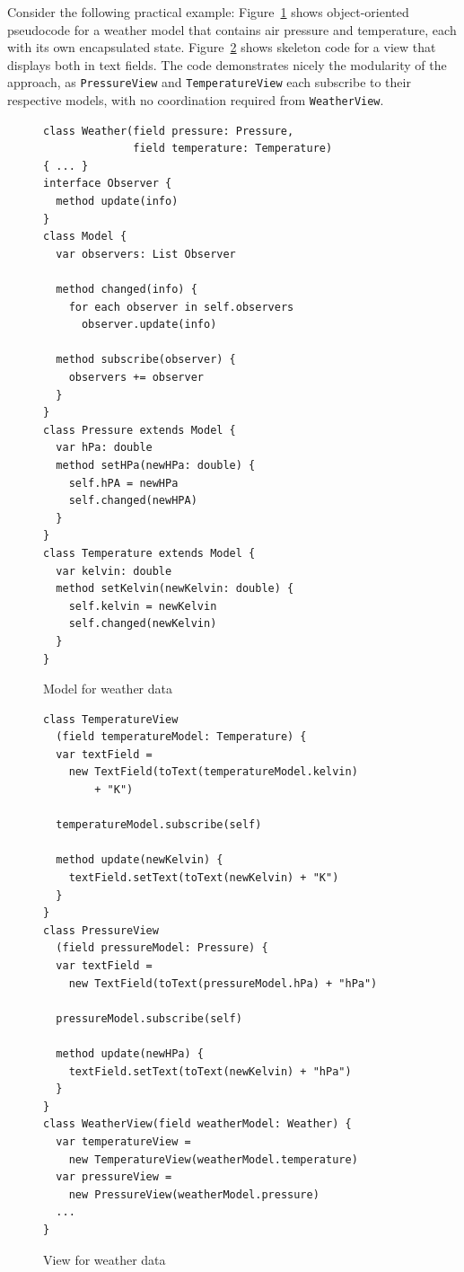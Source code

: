 \documentclass[sigplan,screen]{acmart}
\begin{document}
%
%
Consider the following practical example:
Figure~\ref{fig:weather-model} shows object-oriented pseudocode for a
weather model that contains air pressure and temperature, each with
its own encapsulated state.  Figure~\ref{fig:weather-view} shows
skeleton code for a view that displays both in text fields.  The code
demonstrates nicely the modularity of the approach, as
\texttt{PressureView} and \texttt{TemperatureView} each subscribe to
their respective models, with no coordination required from
\texttt{WeatherView}.

\begin{figure}[tb]
\begin{verbatim}
class Weather(field pressure: Pressure,
              field temperature: Temperature)
{ ... }
interface Observer {
  method update(info)
}
class Model {
  var observers: List Observer

  method changed(info) {
    for each observer in self.observers
      observer.update(info)

  method subscribe(observer) {
    observers += observer
  }
}
class Pressure extends Model {
  var hPa: double
  method setHPa(newHPa: double) {
    self.hPA = newHPa
    self.changed(newHPA)
  }
}
class Temperature extends Model {
  var kelvin: double
  method setKelvin(newKelvin: double) {
    self.kelvin = newKelvin
    self.changed(newKelvin)
  }
}
\end{verbatim}
  \vspace*{-3ex}
  \caption{Model for weather data}
  \label{fig:weather-model}
\end{figure}

\begin{figure}[tb]
\begin{verbatim}
class TemperatureView
  (field temperatureModel: Temperature) {
  var textField =
    new TextField(toText(temperatureModel.kelvin)
        + "K")

  temperatureModel.subscribe(self)

  method update(newKelvin) {
    textField.setText(toText(newKelvin) + "K")
  }
}
class PressureView
  (field pressureModel: Pressure) {
  var textField =
    new TextField(toText(pressureModel.hPa) + "hPa")

  pressureModel.subscribe(self)

  method update(newHPa) {
    textField.setText(toText(newKelvin) + "hPa")
  }
}
class WeatherView(field weatherModel: Weather) {
  var temperatureView =
    new TemperatureView(weatherModel.temperature)
  var pressureView =
    new PressureView(weatherModel.pressure)
  ...
}
\end{verbatim}
  \vspace*{-2ex}
  \caption{View for weather data}
  \label{fig:weather-view}
\end{figure}
\end{document}
